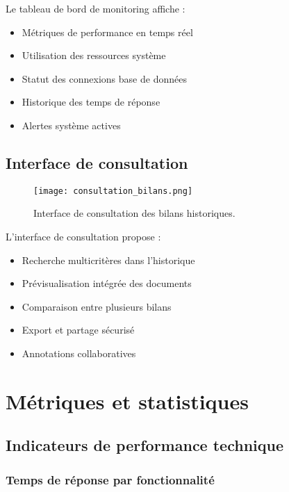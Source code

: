 Le tableau de bord de monitoring affiche :
\begin{itemize}
    \item Métriques de performance en temps réel
    \item Utilisation des ressources système
    \item Statut des connexions base de données
    \item Historique des temps de réponse
    \item Alertes système actives
\end{itemize}

\section{Interface de consultation}

\begin{figure}[hbt!]
    \centering
    \texttt{[image: consultation\_bilans.png]}
    \caption{Interface de consultation des bilans historiques.}
    \label{fig:consultation}
\end{figure}

L'interface de consultation propose :
\begin{itemize}
    \item Recherche multicritères dans l'historique
    \item Prévisualisation intégrée des documents
    \item Comparaison entre plusieurs bilans
    \item Export et partage sécurisé
    \item Annotations collaboratives
\end{itemize}

\chapter{Métriques et statistiques}
\label{app:metriques}

\section{Indicateurs de performance technique}

\subsection{Temps de réponse par fonctionnalité}

